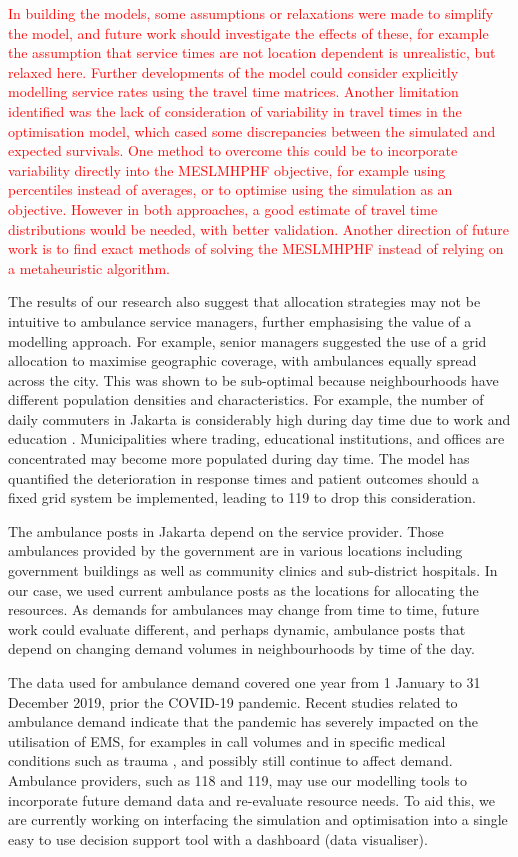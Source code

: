 \documentclass[numbers,webpdf,imaman]{ima-authoring-template}%
\begin{document}
\textcolor{red}{In building the models, some assumptions or relaxations were
made to simplify the model, and future work should investigate the effects of
these, for example the assumption that service times are not location dependent
is unrealistic, but relaxed here. Further developments of the model could
consider explicitly modelling service rates using the travel time matrices.
Another limitation identified was the lack of consideration of variability in
travel times in the optimisation model, which cased some discrepancies between
the simulated and expected survivals. One method to overcome this could be to
incorporate variability directly into the MESLMHPHF objective, for example using
percentiles instead of averages, or to optimise using the simulation as an
objective. However in both approaches, a good estimate of travel time
distributions would be needed, with better validation.
Another direction of future work is to find exact methods of solving the
MESLMHPHF instead of relying on a metaheuristic algorithm.}

The results of our research also suggest that allocation strategies may not be
intuitive to ambulance service managers, further emphasising the value of a
modelling approach. For example, senior managers suggested the use of a grid
allocation to maximise geographic coverage, with ambulances equally spread
across the city. This was shown to be sub-optimal because neighbourhoods have
different population densities and characteristics. For example, the number of
daily commuters in Jakarta is considerably high during day time due to work
and education \citep{BPS_Jakarta_migrasi}. Municipalities where trading,
educational institutions, and offices are concentrated may become more
populated during day time. The model has quantified the deterioration in
response times and patient outcomes should a fixed grid system be implemented,
leading to 119 to drop this consideration.

The ambulance posts in Jakarta depend on the service provider. Those
ambulances provided by the government are in various locations including
government buildings as well as community clinics and sub-district hospitals.
In our case, we used current ambulance posts as the locations for allocating
the resources. As demands for ambulances may change from time to time, future
work could evaluate different, and perhaps dynamic, ambulance posts that
depend on changing demand volumes in neighbourhoods by time of the day.

The data used for ambulance demand covered one year from 1 January to 31
December 2019, prior the COVID-19 pandemic. Recent studies related to
ambulance demand indicate that the  pandemic has severely impacted on the
utilisation of EMS, for examples in call volumes \citep{csan2021effects} and in
specific medical conditions such as trauma \citep{azbel2021effects}, and
possibly still continue to affect demand. Ambulance providers, such as 118 and
119, may use our modelling tools to incorporate future demand data and
re-evaluate resource needs. To aid this, we are currently working on
interfacing the simulation and optimisation into a single easy to use decision
support tool with a dashboard (data visualiser). 
\end{document}

